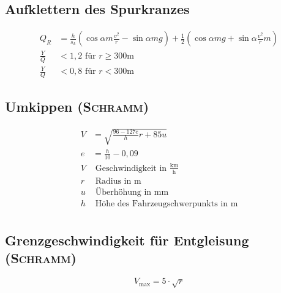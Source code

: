\documentclass{scrartcl}
\begin{document}
	\subsection{Aufklettern des Spurkranzes}
	\begin{align*}
		Q_R &= \frac{h}{s_k} (\cos\alpha{}m\frac{v^2}{r}-\sin\alpha{}mg) + \frac{1}{2}(\cos\alpha{}mg + \sin\alpha{}\frac{v^2}{r}m) \\
		\frac{Y}{Q} &< 1,2 \text{ für } r\geq300\mathrm{m} \\
		\frac{Y}{Q} &< 0,8 \text{ für } r<300\mathrm{m}
	\end{align*}

	\subsection{Umkippen (\textsc{Schramm})}
	\begin{align*}
		V &= \sqrt{\frac{96-127e}{h}r+85u} \\
		e &= \frac{h}{10}-0,09 \\
		V & \text{ Geschwindigkeit in }\frac{\mathrm{km}}{\mathrm{h}} \\
		r & \text{ Radius in } \mathrm{m} \\
		u & \text{ Überhöhung in } \mathrm{mm} \\
		h & \text{ Höhe des Fahrzeugschwerpunkts in } \mathrm{m}\\
	\end{align*}

	\subsection{Grenzgeschwindigkeit für Entgleisung (\textsc{Schramm})}
	$$ V_\mathrm{max} = 5\cdot\sqrt{r} $$
\end{document}
